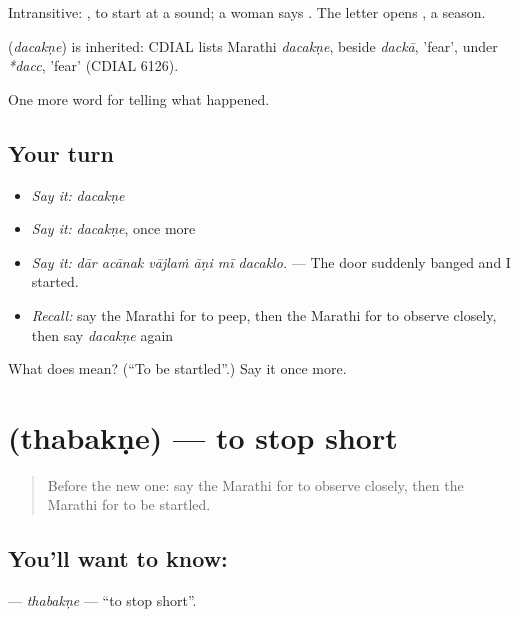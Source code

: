 Intransitive:  , to start at a sound; a woman says  . The letter  opens , a season.

\begin{cousinweb}
\textbf{} (\emph{dacakṇe}) is inherited: CDIAL lists Marathi \emph{dacakṇe}, beside \emph{dackā}, 'fear', under \emph{*dacc}, 'fear' (CDIAL 6126).
\end{cousinweb}

\begin{grammarlens}[title={What you've built}]
One more word for telling what happened.
\end{grammarlens}

\subsection*{Your turn}
\begin{itemize}
\raggedright
  \item \emph{Say it:} \emph{dacakṇe}
  \item \emph{Say it:} \emph{dacakṇe}, once more
  \item \emph{Say it:} \emph{dār acānak vājlaṁ āṇi mī dacaklo.} — The door suddenly banged and I started.
  \item \emph{Recall:} say the Marathi for to peep, then the Marathi for to observe closely, then say \emph{dacakṇe} again
\end{itemize}

\begin{tcolorbox}[breakable,colback=teal!4,colframe=teal!35!black,title={Before you move on}]
What does  mean? (\textquotedblleft{}To be startled\textquotedblright{}.) Say it once more.
\end{tcolorbox}
\section[\texorpdfstring{\mr{थबकणे} (thabakṇe)}{थबकणे (thabakṇe)}]{ (thabakṇe) — to stop short}

\label{lesson:MR-C302-thabakne}



\begin{quote}
Before the new one: say the Marathi for to observe closely, then the Marathi for to be startled.
\end{quote}

\subsection*{You'll want to know: }
\textbf{} — \emph{thabakṇe} — \textquotedblleft{}to stop short\textquotedblright{}.

